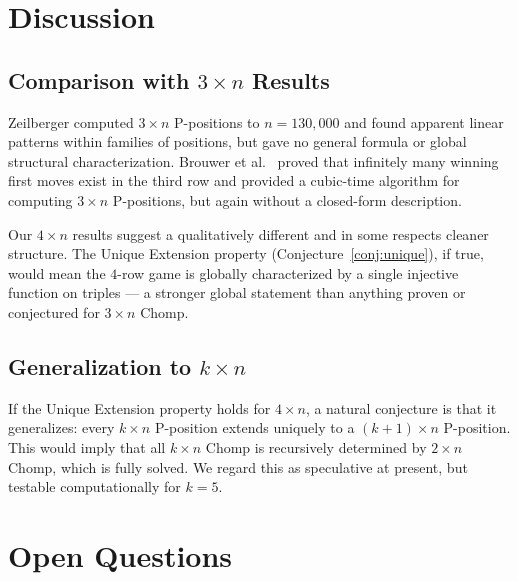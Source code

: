 \documentclass[12pt]{article}
\begin{document}
\section{Discussion}

\subsection{Comparison with \texorpdfstring{$3 \times n$}{3xn} Results}

Zeilberger \cite{zeilberger2001} computed $3 \times n$ P-positions
to $n = 130{,}000$ and found apparent linear patterns within families
of positions, but gave no general formula or global structural
characterization. Brouwer et al.\ \cite{brouwer2005} proved that
infinitely many winning first moves exist in the third row and provided
a cubic-time algorithm for computing $3 \times n$ P-positions, but
again without a closed-form description.

Our $4 \times n$ results suggest a qualitatively different and in some
respects cleaner structure. The Unique Extension property
(Conjecture~\ref{conj:unique}), if true, would mean the $4$-row game
is globally characterized by a single injective function on triples ---
a stronger global statement than anything proven or conjectured for
$3 \times n$ Chomp.

\subsection{Generalization to \texorpdfstring{$k \times n$}{kxn}}

If the Unique Extension property holds for $4 \times n$, a natural
conjecture is that it generalizes: every $k \times n$ P-position
extends uniquely to a $(k+1) \times n$ P-position. This would imply
that all $k \times n$ Chomp is recursively determined by $2 \times n$
Chomp, which is fully solved. We regard this as speculative at present,
but testable computationally for $k = 5$.

\section{Open Questions}
\end{document}
